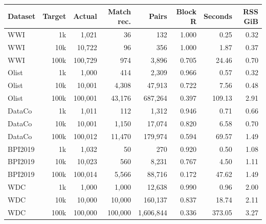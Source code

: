 \begin{tabular}{lrrrrrrr}
\toprule
Dataset & Target & Actual & Match rec. & Pairs & Block R & Seconds & RSS GiB \\
\midrule
WWI & 1k & 1,021 & 36 & 132 & 1.000 & 0.25 & 0.32 \\
WWI & 10k & 10,722 & 96 & 356 & 1.000 & 1.87 & 0.37 \\
WWI & 100k & 100,729 & 974 & 3,896 & 0.705 & 24.46 & 0.70 \\
Olist & 1k & 1,000 & 414 & 2,309 & 0.966 & 0.57 & 0.32 \\
Olist & 10k & 10,001 & 4,308 & 47,913 & 0.722 & 7.56 & 0.48 \\
Olist & 100k & 100,001 & 43,176 & 687,264 & 0.397 & 109.13 & 2.91 \\
DataCo & 1k & 1,011 & 112 & 1,312 & 0.946 & 0.71 & 0.66 \\
DataCo & 10k & 10,001 & 1,150 & 17,074 & 0.820 & 6.58 & 0.70 \\
DataCo & 100k & 100,012 & 11,470 & 179,974 & 0.594 & 69.57 & 1.49 \\
BPI2019 & 1k & 1,032 & 50 & 270 & 0.920 & 0.50 & 1.08 \\
BPI2019 & 10k & 10,023 & 560 & 8,231 & 0.767 & 4.50 & 1.11 \\
BPI2019 & 100k & 100,014 & 5,566 & 88,716 & 0.172 & 47.62 & 1.49 \\
WDC & 1k & 1,000 & 1,000 & 12,638 & 0.990 & 0.96 & 2.00 \\
WDC & 10k & 10,000 & 10,000 & 160,137 & 0.837 & 18.74 & 2.11 \\
WDC & 100k & 100,000 & 100,000 & 1,606,844 & 0.336 & 373.05 & 3.27 \\
\bottomrule
\end{tabular}
